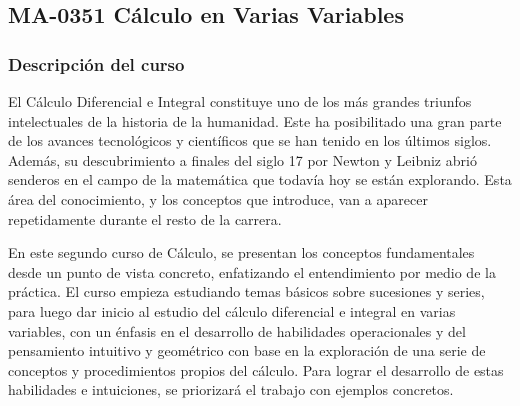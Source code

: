 
\newpage
\subsection*{MA-0351 Cálculo en Varias Variables}

\hypertarget{MA0351}{}
\begin{refsection}


\begin{table}[H]
\end{table} 


\subsubsection*{Descripción del curso}

El Cálculo Diferencial e Integral constituye uno de los más grandes triunfos intelectuales de la historia de la humanidad. Este ha posibilitado una gran parte de los avances tecnológicos y científicos que se han tenido en los últimos siglos. Además, su descubrimiento a finales del siglo 17 por Newton y Leibniz  abrió senderos en el campo de la matemática que todavía hoy se están explorando.
Esta área del conocimiento, y los conceptos que introduce, van a aparecer repetidamente durante el resto de la carrera.

En este segundo curso de Cálculo, se presentan los conceptos fundamentales desde un punto de vista concreto, enfatizando el entendimiento por medio de la práctica. El curso empieza estudiando temas básicos sobre sucesiones y series, para luego dar inicio al estudio del cálculo diferencial e integral en varias variables, con un énfasis en el desarrollo de habilidades operacionales y del pensamiento intuitivo y geométrico con base en la exploración de una serie de conceptos y procedimientos propios del cálculo. Para lograr el desarrollo de estas habilidades e intuiciones, se priorizará el trabajo con ejemplos concretos.


\end{refsection}
